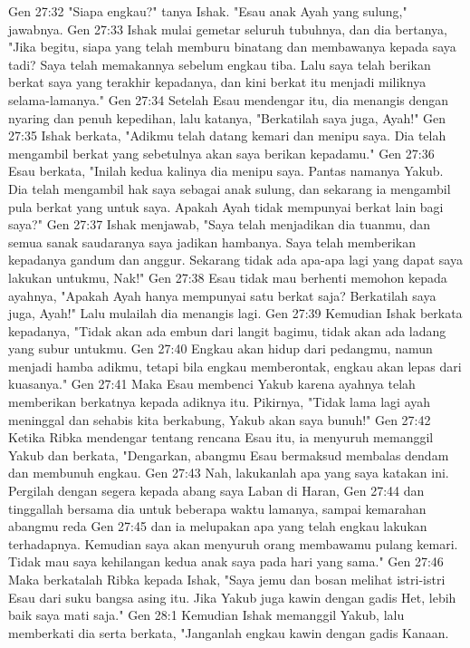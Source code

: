 Gen 27:32  "Siapa engkau?" tanya Ishak. "Esau anak Ayah yang sulung," jawabnya.
Gen 27:33  Ishak mulai gemetar seluruh tubuhnya, dan dia bertanya, "Jika begitu, siapa yang telah memburu binatang dan membawanya kepada saya tadi? Saya telah memakannya sebelum engkau tiba. Lalu saya telah berikan berkat saya yang terakhir kepadanya, dan kini berkat itu menjadi miliknya selama-lamanya."
Gen 27:34  Setelah Esau mendengar itu, dia menangis dengan nyaring dan penuh kepedihan, lalu katanya, "Berkatilah saya juga, Ayah!"
Gen 27:35  Ishak berkata, "Adikmu telah datang kemari dan menipu saya. Dia telah mengambil berkat yang sebetulnya akan saya berikan kepadamu."
Gen 27:36  Esau berkata, "Inilah kedua kalinya dia menipu saya. Pantas namanya Yakub. Dia telah mengambil hak saya sebagai anak sulung, dan sekarang ia mengambil pula berkat yang untuk saya. Apakah Ayah tidak mempunyai berkat lain bagi saya?"
Gen 27:37  Ishak menjawab, "Saya telah menjadikan dia tuanmu, dan semua sanak saudaranya saya jadikan hambanya. Saya telah memberikan kepadanya gandum dan anggur. Sekarang tidak ada apa-apa lagi yang dapat saya lakukan untukmu, Nak!"
Gen 27:38  Esau tidak mau berhenti memohon kepada ayahnya, "Apakah Ayah hanya mempunyai satu berkat saja? Berkatilah saya juga, Ayah!" Lalu mulailah dia menangis lagi.
Gen 27:39  Kemudian Ishak berkata kepadanya, "Tidak akan ada embun dari langit bagimu, tidak akan ada ladang yang subur untukmu.
Gen 27:40  Engkau akan hidup dari pedangmu, namun menjadi hamba adikmu, tetapi bila engkau memberontak, engkau akan lepas dari kuasanya."
Gen 27:41  Maka Esau membenci Yakub karena ayahnya telah memberikan berkatnya kepada adiknya itu. Pikirnya, "Tidak lama lagi ayah meninggal dan sehabis kita berkabung, Yakub akan saya bunuh!"
Gen 27:42  Ketika Ribka mendengar tentang rencana Esau itu, ia menyuruh memanggil Yakub dan berkata, "Dengarkan, abangmu Esau bermaksud membalas dendam dan membunuh engkau.
Gen 27:43  Nah, lakukanlah apa yang saya katakan ini. Pergilah dengan segera kepada abang saya Laban di Haran,
Gen 27:44  dan tinggallah bersama dia untuk beberapa waktu lamanya, sampai kemarahan abangmu reda
Gen 27:45  dan ia melupakan apa yang telah engkau lakukan terhadapnya. Kemudian saya akan menyuruh orang membawamu pulang kemari. Tidak mau saya kehilangan kedua anak saya pada hari yang sama."
Gen 27:46  Maka berkatalah Ribka kepada Ishak, "Saya jemu dan bosan melihat istri-istri Esau dari suku bangsa asing itu. Jika Yakub juga kawin dengan gadis Het, lebih baik saya mati saja."
Gen 28:1  Kemudian Ishak memanggil Yakub, lalu memberkati dia serta berkata, "Janganlah engkau kawin dengan gadis Kanaan.
